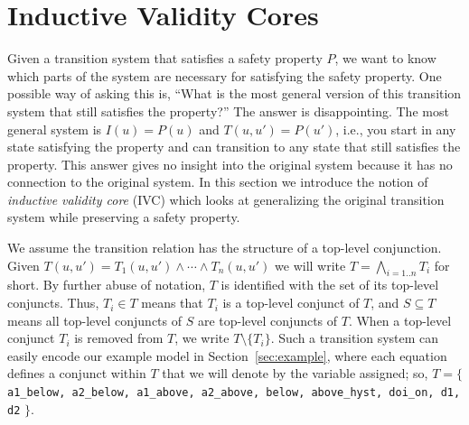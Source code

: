 \section{Inductive Validity Cores}
\label{sec:ivc}
\newcommand{\ivc}{\textit{IVC}\xspace}
\newcommand{\mivc}{\textit{MIVC}}
\newcommand{\aivc}{\textit{AIVC}}
\newcommand{\must}{\textit{MUST}}
\newcommand{\may}{\textit{MAY}}

\newcommand{\bq}{\textsc{BaseQuery}\xspace}
\newcommand{\iq}{\textsc{IndQuery}\xspace}
\newcommand{\fq}{\textsc{FullQuery}\xspace}

\newcommand{\mink}{\textsc{MinimizeK}\xspace}
\newcommand{\reduceinv}{\textsc{ReduceInvariants}\xspace}
\newcommand{\minivc}{\textsc{MinimizeIvc}\xspace}

\newcommand{\checksat}{\textsc{CheckSat}}
\newcommand{\isadeq}{\textsc{CheckAdq}}
\newcommand{\actlit}{\textsc{ActLit}}
\newcommand{\unsatcore}{\textsc{UnsatCore}\xspace}
\newcommand{\unsat}{\texttt{UNSAT}\xspace}
\newcommand{\sat}{\texttt{SAT}\xspace}

\newcommand{\getivc}{\textsc{GetIVC}}
\newcommand{\getmodel}{\textsc{GetLiteralsFromMaxModel}}
\newcommand{\aivcalg}{\texttt{\small{All\_IVCs}}}
\newcommand{\blockup}{\textsc{BlockUp}}
\newcommand{\blockdown}{\textsc{BlockDown}}
\newcommand{\mis}{\textit{MIS}}
\newcommand{\mcs}{\textit{MCS}}

Given a transition system that satisfies a safety property $P$, we
want to know which parts of the system are necessary for satisfying
the safety property. One possible way of asking this is, ``What is the
most general version of this transition system that still satisfies
the property?'' The answer is disappointing. The most general system is
$I(u) = P(u)$ and $T(u, u') = P(u')$, i.e., you start in any state
satisfying the property and can transition to any state that still
satisfies the property.  This answer gives no insight into the original
system because it has no connection to the original system. In this
section we introduce the notion of {\em inductive validity core} (IVC)
which looks at generalizing the original transition system while
preserving a safety property.

We assume the transition relation has the structure of a top-level conjunction.  Given $T(u, u') = T_1(u, u') \land \cdots \land T_n(u, u')$ we will write $T = \bigwedge_{i=1..n}T_i$ for short.
By further abuse of notation,
$T$ is identified with the set of its top-level conjuncts. Thus, $T_i \in
T$ means that $T_i$ is a top-level conjunct of $T$, and $S
\subseteq T$ means all top-level conjuncts of $S$ are top-level
conjuncts of $T$. When a top-level conjunct $T_i$ is removed from $T$, we write $T \setminus \{T_i\}$. Such a transition system can easily encode our example model in Section~\ref{sec:example}, where each equation defines a conjunct within $T$ that we will denote by the variable assigned; so, $T = \{$ {\small \texttt{a1\_below, a2\_below, a1\_above, a2\_above, below, above\_hyst, doi\_on, d1, d2}} $\}$.

